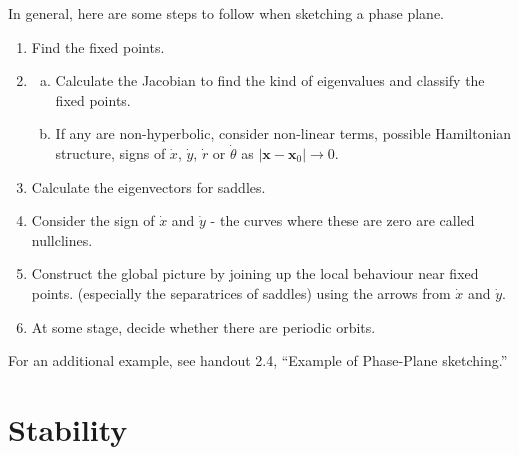 \documentclass{article}
\begin{document}
\noindent In general, here are some steps to follow when sketching a phase plane.
\begin{enumerate}[1.]
\item Find the fixed points.
\item \begin{enumerate}[(a)] \item Calculate the Jacobian to find the kind of eigenvalues and classify
				the fixed points.
				\item If any are non-hyperbolic, consider non-linear terms, possible
				Hamiltonian structure, signs of $\dot{x}$, $\dot{y}$, $\dot{r}$ or 
				$\dot{\theta}$ as $|\bm{x} - \bm{x}_0| \to 0$.
      \end{enumerate}
\item Calculate the eigenvectors for saddles.
\item Consider the sign of $\dot{x}$ and $\dot{y}$ - the curves where these are
zero are called nullclines.
\item Construct the global picture by joining up the local behaviour near fixed
points. (especially the separatrices of saddles) using the arrows from $\dot{x}$
and $\dot{y}$.
\item At some stage, decide whether there are periodic orbits.
\end{enumerate}
%
%
%
For an additional example, see handout 2.4, ``Example of Phase-Plane sketching.''
\section{Stability}
\end{document}

